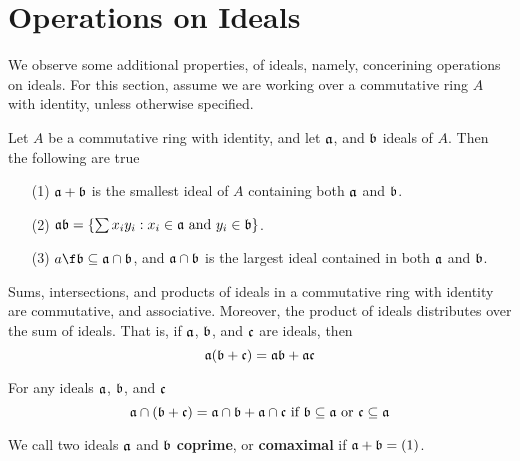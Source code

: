 \section{Operations on Ideals}

We observe some additional properties, of ideals, namely, concerining operations
on ideals. For this section, assume we are working over a commutative ring $A$
with identity, unless otherwise specified.

\begin{lemma}\label{1.6.1}
    Let $A$ be a commutative ring with identity, and let $\af$, and $\bf$ ideals
    of  $A$. Then the following are true
    \begin{enumerate}
        \item[(1)] $\af+\bf$ is the smallest ideal of $A$ containing both $\af$
            and  $\bf$.

        \item[(2)] $\af\bf=\{\sum{x_iy_i} : x_i \in \af \text{ and } y_i \in \bf\}$.

        \item[(3)] $a\f\bf \subseteq \af \cap \bf$, and $\af \cap \bf$ is the
            largest ideal contained in both $\af$ and $\bf$.
    \end{enumerate}
\end{lemma}

\begin{lemma}\label{1.6.2}
    Sums, intersections, and products of ideals in a commutative ring with
    identity are commutative, and associative. Moreover, the product of ideals
    distributes over the sum of ideals. That is, if $\af$, $\bf$, and $\cf$ are
    ideals, then
    \begin{equation*}
        \af(\bf+\cf)=\af\bf+\af\cf
    \end{equation*}
\end{lemma}

\begin{lemma}\label{1.6.3}
    For any ideals $\af$, $\bf$, and $\cf$
    \begin{equation*}
        \af \cap (\bf+\cf)=\af \cap \bf+\af \cap \cf \text{ if }
        \bf \subseteq \af \text{ or } \cf \subseteq \af
    \end{equation*}
\end{lemma}

\begin{definition}
    We call two ideals $\af$ and  $\bf$ \textbf{coprime}, or \textbf{comaximal}
    if $\af+\bf=(1)$.
\end{definition}

